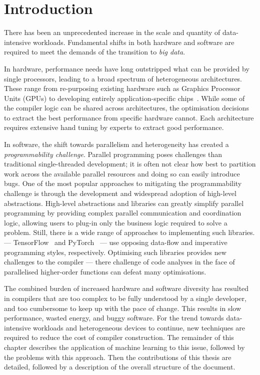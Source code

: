 \chapter{Introduction}

There has been an unprecedented increase in the scale and quantity of data-intensive workloads. Fundamental shifts in both hardware and software are required to meet the demands of the transition to \emph{big data}.

In hardware, performance needs have long outstripped what can be provided by single processors, leading to a broad spectrum of heterogeneous architectures. These range from re-purposing existing hardware such as Graphics Processor Units (GPUs) to developing entirely application-specific chips~\cite{Misra2010,Jouppi2017}. While some of the compiler logic can be shared across architectures, the optimisation decisions to extract the best performance from specific hardware cannot. Each architecture requires extensive hand tuning by experts to extract good performance.

In software, the shift towards parallelism and heterogeneity has created a \emph{programmability challenge}. Parallel programming poses  challenges than traditional single-threaded development; it is often not clear how best to partition work across the available parallel resources and doing so can easily introduce bugs. One of the most popular approaches to mitigating the programmability challenge is through the development and widespread adoption of high-level abstractions. High-level abstractions and libraries can greatly simplify parallel programming by providing complex parallel communication and coordination logic, allowing users to plug-in only the business logic required to solve a problem. Still, there is a wide range of approaches to implementing such libraries.  --- TensorFlow~\cite{Abadi} and PyTorch~\cite{Paszke2017} --- use opposing data-flow and imperative programming styles, respectively. Optimising such libraries provides new challenges to the compiler --- there challenge of code analyses in the face of parallelised higher-order functions can defeat many optimisations.

The combined burden of increased hardware and software diversity has resulted in compilers that are too complex to be fully understood by a single developer, and too cumbersome to keep up with the pace of change. This results in slow performance, wasted energy, and buggy software. For the trend towards data-intensive workloads and heterogeneous devices to continue, new techniques are required to reduce the cost of compiler construction. The remainder of this chapter describes the application of machine learning to this issue, followed by the problems with this approach. Then the contributions of this thesis are detailed, followed by a description of the overall structure of the document.


